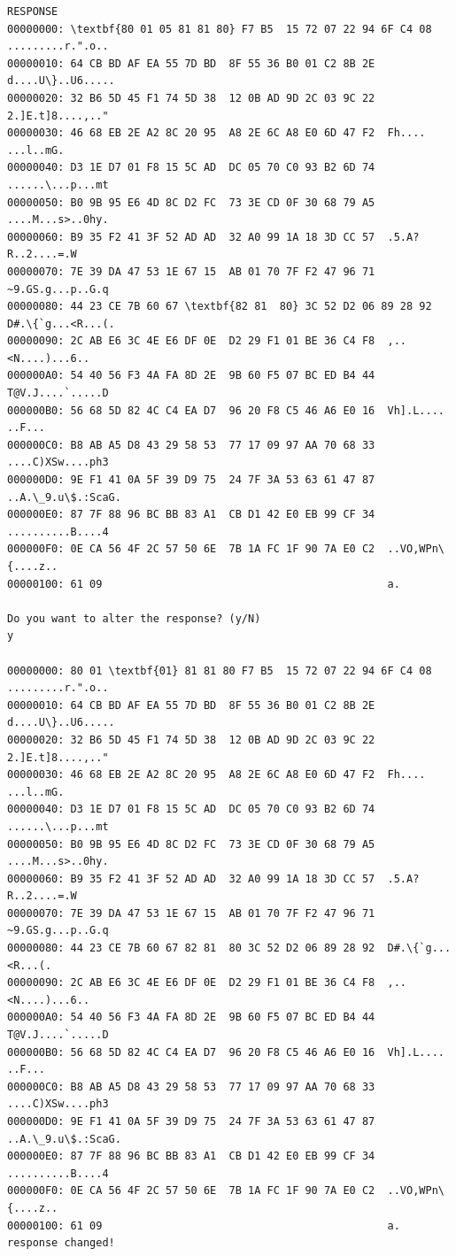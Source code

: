 \documentclass[bsc,frontabs,twoside,singlespacing,parskip,deptreport]{infthesis}     %
\begin{document}
\begin{appendices}
\begin{Verbatim}[commandchars=\\\{\}, fontsize=\small]
RESPONSE
00000000: \textbf{80 01 05 81 81 80} F7 B5  15 72 07 22 94 6F C4 08  .........r.".o..
00000010: 64 CB BD AF EA 55 7D BD  8F 55 36 B0 01 C2 8B 2E  d....U\}..U6.....
00000020: 32 B6 5D 45 F1 74 5D 38  12 0B AD 9D 2C 03 9C 22  2.]E.t]8....,.."
00000030: 46 68 EB 2E A2 8C 20 95  A8 2E 6C A8 E0 6D 47 F2  Fh.... ...l..mG.
00000040: D3 1E D7 01 F8 15 5C AD  DC 05 70 C0 93 B2 6D 74  ......\...p...mt
00000050: B0 9B 95 E6 4D 8C D2 FC  73 3E CD 0F 30 68 79 A5  ....M...s>..0hy.
00000060: B9 35 F2 41 3F 52 AD AD  32 A0 99 1A 18 3D CC 57  .5.A?R..2....=.W
00000070: 7E 39 DA 47 53 1E 67 15  AB 01 70 7F F2 47 96 71  ~9.GS.g...p..G.q
00000080: 44 23 CE 7B 60 67 \textbf{82 81  80} 3C 52 D2 06 89 28 92  D#.\{`g...<R...(.
00000090: 2C AB E6 3C 4E E6 DF 0E  D2 29 F1 01 BE 36 C4 F8  ,..<N....)...6..
000000A0: 54 40 56 F3 4A FA 8D 2E  9B 60 F5 07 BC ED B4 44  T@V.J....`.....D
000000B0: 56 68 5D 82 4C C4 EA D7  96 20 F8 C5 46 A6 E0 16  Vh].L.... ..F...
000000C0: B8 AB A5 D8 43 29 58 53  77 17 09 97 AA 70 68 33  ....C)XSw....ph3
000000D0: 9E F1 41 0A 5F 39 D9 75  24 7F 3A 53 63 61 47 87  ..A.\_9.u\$.:ScaG.
000000E0: 87 7F 88 96 BC BB 83 A1  CB D1 42 E0 EB 99 CF 34  ..........B....4
000000F0: 0E CA 56 4F 2C 57 50 6E  7B 1A FC 1F 90 7A E0 C2  ..VO,WPn\{....z..
00000100: 61 09                                             a.

Do you want to alter the response? (y/N)
y

00000000: 80 01 \textbf{01} 81 81 80 F7 B5  15 72 07 22 94 6F C4 08  .........r.".o..
00000010: 64 CB BD AF EA 55 7D BD  8F 55 36 B0 01 C2 8B 2E  d....U\}..U6.....
00000020: 32 B6 5D 45 F1 74 5D 38  12 0B AD 9D 2C 03 9C 22  2.]E.t]8....,.."
00000030: 46 68 EB 2E A2 8C 20 95  A8 2E 6C A8 E0 6D 47 F2  Fh.... ...l..mG.
00000040: D3 1E D7 01 F8 15 5C AD  DC 05 70 C0 93 B2 6D 74  ......\...p...mt
00000050: B0 9B 95 E6 4D 8C D2 FC  73 3E CD 0F 30 68 79 A5  ....M...s>..0hy.
00000060: B9 35 F2 41 3F 52 AD AD  32 A0 99 1A 18 3D CC 57  .5.A?R..2....=.W
00000070: 7E 39 DA 47 53 1E 67 15  AB 01 70 7F F2 47 96 71  ~9.GS.g...p..G.q
00000080: 44 23 CE 7B 60 67 82 81  80 3C 52 D2 06 89 28 92  D#.\{`g...<R...(.
00000090: 2C AB E6 3C 4E E6 DF 0E  D2 29 F1 01 BE 36 C4 F8  ,..<N....)...6..
000000A0: 54 40 56 F3 4A FA 8D 2E  9B 60 F5 07 BC ED B4 44  T@V.J....`.....D
000000B0: 56 68 5D 82 4C C4 EA D7  96 20 F8 C5 46 A6 E0 16  Vh].L.... ..F...
000000C0: B8 AB A5 D8 43 29 58 53  77 17 09 97 AA 70 68 33  ....C)XSw....ph3
000000D0: 9E F1 41 0A 5F 39 D9 75  24 7F 3A 53 63 61 47 87  ..A.\_9.u\$.:ScaG.
000000E0: 87 7F 88 96 BC BB 83 A1  CB D1 42 E0 EB 99 CF 34  ..........B....4
000000F0: 0E CA 56 4F 2C 57 50 6E  7B 1A FC 1F 90 7A E0 C2  ..VO,WPn\{....z..
00000100: 61 09                                             a.
response changed!


\end{Verbatim}
\end{appendices}
\end{document}
